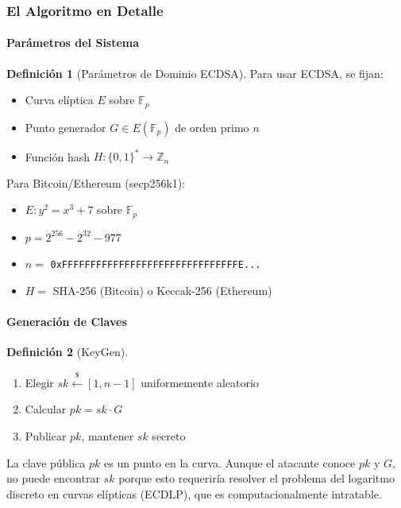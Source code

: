 \documentclass[11pt,a4paper,twoside,openright]{book}
\theoremstyle{definition}
\newtheorem{definition}{Definición}[chapter]
\theoremstyle{plain}
\theoremstyle{remark}
\newcommand{\Fp}{\mathbb{F}_p}
\newcommand{\Z}{\mathbb{Z}}
\begin{document}
\subsubsection{El Algoritmo en Detalle}

\paragraph{Parámetros del Sistema}

\begin{definition}[Parámetros de Dominio ECDSA]
Para usar ECDSA, se fijan:
\begin{itemize}
    \item Curva elíptica $E$ sobre $\Fp$
    \item Punto generador $G \in E(\Fp)$ de orden primo $n$
    \item Función hash $H: \{0,1\}^* \to \Z_n$
\end{itemize}

Para Bitcoin/Ethereum (secp256k1):
\begin{itemize}
    \item $E: y^2 = x^3 + 7$ sobre $\Fp$
    \item $p = 2^{256} - 2^{32} - 977$
    \item $n = $ \texttt{0xFFFFFFFFFFFFFFFFFFFFFFFFFFFFFFFE...}
    \item $H = $ SHA-256 (Bitcoin) o Keccak-256 (Ethereum)
\end{itemize}
\end{definition}

\paragraph{Generación de Claves}

\begin{definition}[KeyGen]
\begin{enumerate}
    \item Elegir $sk \xleftarrow{\$} [1, n-1]$ uniformemente aleatorio
    \item Calcular $pk = sk \cdot G$
    \item Publicar $pk$, mantener $sk$ secreto
\end{enumerate}
\end{definition}

\begin{intuicion}
La clave pública $pk$ es un punto en la curva. Aunque el atacante conoce $pk$ y $G$, no puede encontrar $sk$ porque esto requeriría resolver el problema del logaritmo discreto en curvas elípticas (ECDLP), que es computacionalmente intratable.
\end{intuicion}
\end{document}
